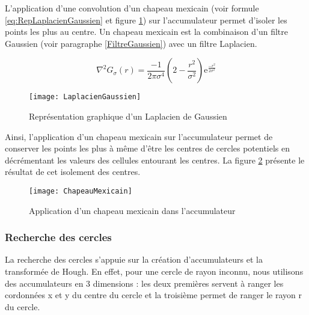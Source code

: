 L’application d’une convolution d’un chapeau mexicain (voir formule \eqref{eq:RepLaplacienGaussien} et figure \ref{fig:LaplacienGaussien}) sur l’accumulateur permet d’isoler les points les plus au centre. Un chapeau mexicain est la combinaison d’un filtre Gaussien (voir paragraphe \ref{FiltreGaussien}) avec un filtre Laplacien.

\begin{equation}
\nabla^2G_\sigma(r) = \frac{-1}{2\pi\sigma^4}(2-\frac{r^2}{\sigma^2}) \mathrm{e}^{\frac{-r^2}{2\sigma^2}}
\label{eq:RepLaplacienGaussien}
\end{equation}

\begin{figure}[H]
  \centering
  \texttt{[image: LaplacienGaussien]}
  \caption{Représentation graphique d’un Laplacien de Gaussien}
  \label{fig:LaplacienGaussien}
\end{figure}

Ainsi, l’application d’un chapeau mexicain sur l’accumulateur permet de conserver les points les plus à même d’être les centres de cercles potentiels en décrémentant les valeurs des cellules entourant les centres. La figure \ref{fig:ChapeauMexicain} présente le résultat de cet isolement des centres.

\begin{figure}[H]
  \centering
  \texttt{[image: ChapeauMexicain]}
  \caption{Application d’un chapeau mexicain dans l’accumulateur}
  \label{fig:ChapeauMexicain}
\end{figure}

\subsubsection{Recherche des cercles}

La recherche des cercles s’appuie sur la création d’accumulateurs et la transformée de Hough. En effet, pour une cercle de rayon inconnu, nous utilisons des accumulateurs en 3 dimensions : les deux premières servent à ranger les cordonnées x et y du centre du cercle et la troisième permet de ranger le rayon r du cercle. 

